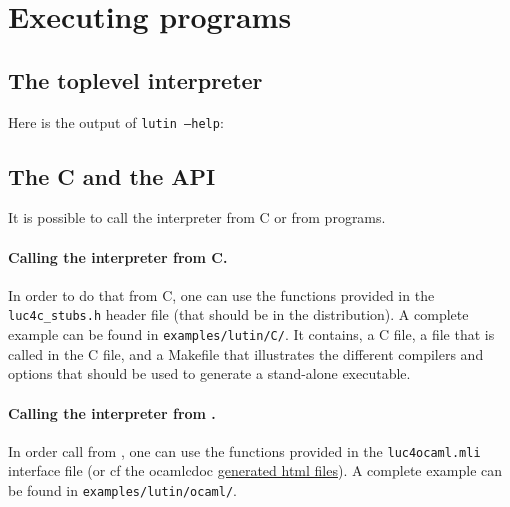 \section{Executing  \lutin programs}



\subsection{The toplevel interpreter}

Here is the output of {\tt lutin --help}:
\begin{alltt}

\end{alltt}



\subsection{The C and the \ocaml API}
\label{api}

It is  possible to call  the \lutin interpreter  from C or  from \Ocaml
programs.

\paragraph{Calling the \lutin interpreter from C.}

In order to do that from C, one can use the functions provided in the
\verb+luc4c_stubs.h+   header   file   (that   should   be   in   the
distribution).    A    complete    example    can   be    found    in
\verb+examples/lutin/C/+.  It  contains, a C file, a  \lutin file that
is  called  in  the C  file,  and  a  Makefile that  illustrates  the
different compilers  and options  that should be  used to  generate a
stand-alone executable.

\paragraph{Calling the \lutin interpreter from \Ocaml.}



In order call \lutin from \ocaml, one can use the functions provided in
the  \verb+luc4ocaml.mli+   interface  file  (or   cf  the  ocamlcdoc
\href{http://www-verimag.imag.fr/DIST-TOOLS/SYNCHRONE/lurette/doc/luc4ocaml/Luc4ocaml.html}{generated  html  files}).   A  complete  example can  be  found  in
\verb+examples/lutin/ocaml/+.





